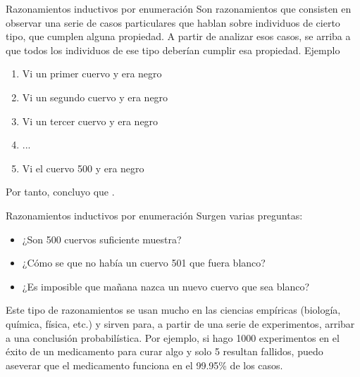 
\begin{frame}{Razonamientos inductivos por enumeración}
  Son razonamientos que consisten en observar una serie de casos particulares
  que hablan sobre individuos de cierto tipo, que cumplen alguna propiedad.
  A partir de analizar esos casos, se arriba a que todos los individuos de ese
  tipo deberían cumplir esa propiedad.
  \jump
  Ejemplo
  \begin{enumerate}
    \item Vi un primer cuervo y era negro
    \item Vi un segundo cuervo y era negro
    \item Vi un tercer cuervo y era negro
    \item ...
    \item Vi el cuervo 500 y era negro
  \end{enumerate}
  Por tanto, concluyo que .
\end{frame}


\begin{frame}{Razonamientos inductivos por enumeración}
  Surgen varias preguntas:
  \begin{itemize}
    \item ¿Son 500 cuervos suficiente muestra?
    \item ¿Cómo se que no había un cuervo 501 que fuera blanco?
    \item ¿Es imposible que mañana nazca un nuevo cuervo que sea blanco?
  \end{itemize}
  Este tipo de razonamientos se usan mucho en las ciencias empíricas (biología,
  química, física, etc.) y sirven para, a partir de una serie de experimentos,
  arribar a una conclusión probabilística.
  \jump
  Por ejemplo, si hago 1000 experimentos en el éxito de un medicamento para curar
  algo y solo 5 resultan fallidos, puedo aseverar que el medicamento funciona en
  el 99.95\% de los casos.
  \jump
\end{frame}



